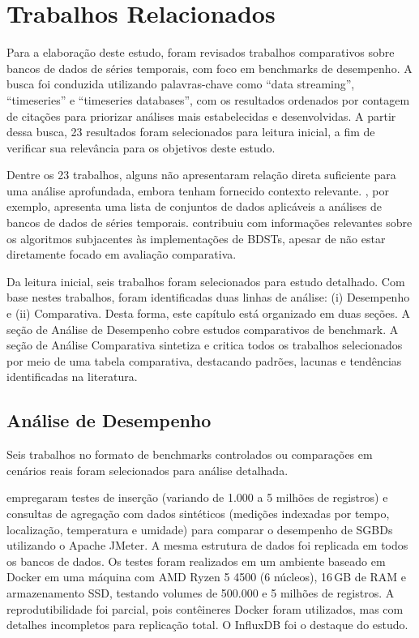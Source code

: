 \section{Trabalhos Relacionados}
\label{sec:related}

Para a elaboração deste estudo, foram revisados trabalhos comparativos sobre bancos de dados de
séries temporais, com foco em benchmarks de desempenho.
A busca foi conduzida utilizando palavras-chave como ``data streaming'', ``timeseries'' e
``timeseries databases'', com os resultados ordenados por contagem de citações para priorizar
análises mais estabelecidas e desenvolvidas. A partir dessa busca, 23 resultados foram
selecionados para leitura inicial, a fim de verificar sua relevância para os objetivos deste estudo.

Dentre os 23 trabalhos, alguns não apresentaram relação direta suficiente para uma análise
aprofundada, embora tenham fornecido contexto relevante. \cite{zubaroglu2021data}, por exemplo,
apresenta uma lista de conjuntos de dados aplicáveis a análises de bancos de dados de séries
temporais. \cite{Gaber2005Mining} contribuiu com informações relevantes sobre os algoritmos
subjacentes às implementações de BDSTs, apesar de não estar diretamente focado em avaliação
comparativa.

Da leitura inicial, seis trabalhos foram selecionados para estudo detalhado. Com base nestes trabalhos, foram identificadas duas linhas de análise: (i) Desempenho e (ii) Comparativa. Desta forma, este capítulo está organizado em duas seções. A seção de Análise de Desempenho cobre estudos comparativos de benchmark. A seção de Análise Comparativa sintetiza e critica todos os trabalhos selecionados por meio de uma tabela comparativa, destacando padrões, lacunas e tendências identificadas na literatura.

\subsection{Análise de Desempenho}

Seis trabalhos no formato de benchmarks controlados ou comparações em cenários reais foram
selecionados para análise detalhada.

\cite{lima2024avaliando} empregaram testes de inserção (variando de 1.000 a 5 milhões de
registros) e consultas de agregação com dados sintéticos (medições indexadas por tempo,
localização, temperatura e umidade) para comparar o desempenho de SGBDs utilizando o Apache
JMeter. A mesma estrutura de dados foi replicada em todos os bancos de dados. Os testes foram
realizados em um ambiente baseado em Docker em uma máquina com AMD Ryzen 5 4500 (6 núcleos),
16\,GB de RAM e armazenamento SSD, testando volumes de 500.000 e 5 milhões de registros. A
reprodutibilidade foi parcial, pois contêineres Docker foram utilizados, mas com detalhes
incompletos para replicação total. O InfluxDB foi o destaque do estudo.

